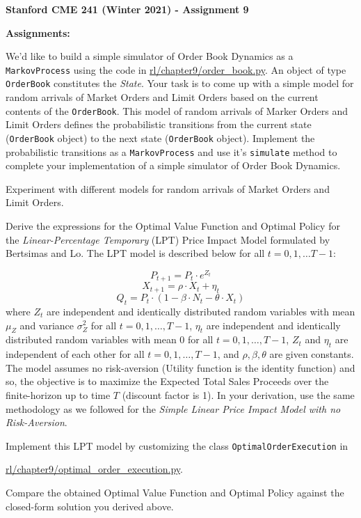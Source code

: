 \documentclass[12pt]{exam}
\begin{document}
\begin{center}
{\large {\bf Stanford CME 241 (Winter 2021) - Assignment 9}}
\end{center}
 
{\large{\bf Assignments:}}
\begin{questions}
\question We'd like to build a simple simulator of Order Book Dynamics as a \lstinline{MarkovProcess} using the code in \href{https://github.com/TikhonJelvis/RL-book/blob/master/rl/chapter9/order_book.py}{rl\//chapter9\//order\_book.py}. An object of type \lstinline{OrderBook} constitutes the {\em State}. Your task is to come up with a simple model for random arrivals of Market Orders and Limit Orders based on the current contents of the \lstinline{OrderBook}. This model of random arrivals of Marker Orders and Limit Orders defines the probabilistic transitions from the current state (\lstinline{OrderBook} object) to the next state (\lstinline{OrderBook} object). Implement the probabilistic transitions as a \lstinline{MarkovProcess} and use it's \lstinline{simulate} method to complete your implementation of a simple simulator of Order Book Dynamics.

Experiment with different models for random arrivals of Market Orders and Limit Orders.

\question Derive the expressions for the Optimal Value Function and Optimal Policy for the {\em Linear-Percentage Temporary} (LPT) Price Impact Model formulated by Bertsimas and Lo. The LPT model is described below for all $t = 0, 1, \ldots T-1$:

$$P_{t+1} = P_t \cdot e^{Z_t}$$
$$X_{t+1} = \rho \cdot X_t + \eta_t$$
$$Q_t = P_t \cdot (1 - \beta \cdot N_t - \theta \cdot X_t)$$
where $Z_t$ are independent and identically distributed random variables with mean $\mu_Z$ and variance $\sigma^2_Z$ for all $t = 0, 1, \ldots, T-1$, $\eta_t$ are independent and identically distributed random variables with mean 0 for all $t = 0, 1, \ldots, T-1$, $Z_t$ and $\eta_t$ are independent of each other for all $t = 0, 1, \ldots, T-1$, and $\rho, \beta, \theta$ are given constants. The model assumes no risk-aversion (Utility function is the identity function) and so, the objective is to maximize the Expected Total Sales Proceeds over the finite-horizon up to time $T$ (discount factor is 1). In your derivation, use the same methodology as we followed for the {\em Simple Linear Price Impact Model with no Risk-Aversion}.

Implement this LPT model by customizing the class \lstinline{OptimalOrderExecution} in 

\href{https://github.com/TikhonJelvis/RL-book/blob/master/rl/chapter9/optimal_order_execution.py}{rl\//chapter9\//optimal\_order\_execution.py}.  

Compare the obtained Optimal Value Function and Optimal Policy against the closed-form solution you derived above.

\end{questions}
\end{document}
